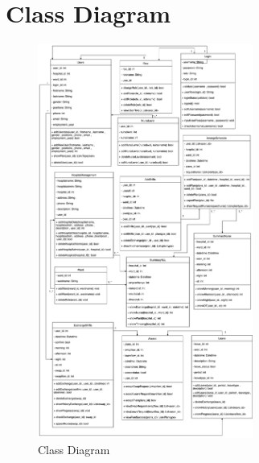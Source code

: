 \baselineskip=8mm
\renewcommand{\thesubsection}{\arabic{subsection}.}
\renewcommand{\theequation}{\thesection.\arabic{equation}}
\renewcommand{\thesection}{}
\renewcommand{\thesubsubsection}{\thesubsection\arabic{subsubsection}.}



\section{Class Diagram}

\vspace{1cm}

\begin{figure}[h]
    \centering
    \includegraphics[width=0.63\textwidth]{Class Diagram.png}
    \caption{Class Diagram}
    \end{figure}

\clearpage



